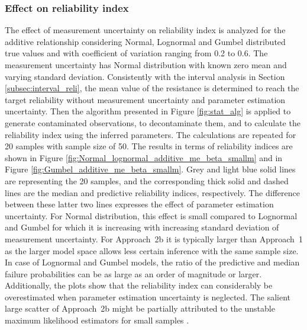 \subsubsection{Effect on reliability index}
The effect of measurement uncertainty on reliability index is analyzed for the additive relationship considering Normal, Lognormal and Gumbel distributed true values and with coefficient of variation ranging from 0.2 to 0.6. The measurement uncertainty has Normal distribution with known zero mean and varying standard deviation. Consistently with the interval analysis in Section \ref{subsec:interval_reli}, the mean value of the resistance is determined to reach the target reliability without measurement uncertainty and parameter estimation uncertainty. Then the algorithm presented in Figure \ref{fig:stat_alg} is applied to generate contaminated observations, to decontaminate them, and to calculate the reliability index using the inferred parameters. The calculations are repeated for 20 samples with sample size of 50. The results in terms of reliability indices are shown in Figure \ref{fig:Normal_lognormal_additive_me_beta_smallm} and in Figure \ref{fig:Gumbel_additive_me_beta_smallm}. Grey and light blue solid lines are representing the 20 samples, and the corresponding thick solid and dashed lines are the median and predictive reliability indices, respectively. The difference between these latter two lines expresses the effect of parameter estimation uncertainty. For Normal distribution, this effect is small compared to Lognormal and Gumbel for which it is increasing with increasing standard deviation of measurement uncertainty. For Approach~2b it is typically larger than Approach~1 as the larger model space allows less certain inference with the same sample size. In case of Lognormal and Gumbel models, the ratio of the predictive and median failure probabilities can be as large as an order of magnitude or larger. Additionally, the plots show that the reliability index can considerably be overestimated when parameter estimation uncertainty is neglected. The salient large scatter of Approach~2b might be partially attributed to the unstable maximum likelihood estimators for small samples \citep{Hosking1985, Martins2000}.
